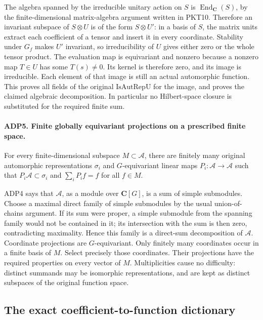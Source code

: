 \documentclass[11pt,a4paper]{article}
\numberwithin{equation}{section}
\theoremstyle{remark}\newtheorem{remark}[theorem]{Remark}
\begin{document}
The algebra spanned by the irreducible unitary action on \(S\) is
\(\operatorname{End}_{\mathbf C}(S)\), by the finite-dimensional
matrix-algebra argument written in PKT10.  Therefore an invariant
subspace of \(S\otimes U\) is of the form \(S\otimes U'\): in a
basis of \(S\), the matrix units extract each coefficient of a tensor
and insert it in every coordinate.  Stability under \(G_f\) makes
\(U'\) invariant, so irreducibility of \(U\) gives either zero or the
whole tensor product.  The evaluation map is equivariant and nonzero
because a nonzero map \(T\in U\) has some \(T(s)\ne0\).  Its kernel
is therefore zero, and its image is irreducible.  Each element of that
image is still an actual automorphic function.  This proves all fields
of the original \(\mathrm{IsAutRepU}\) for the image, and proves the
claimed algebraic decomposition.  In particular no Hilbert-space closure
is substituted for the required finite sum.

\paragraph{ADP5. Finite globally equivariant projections on a prescribed finite space.}
\label{claim:ADP5}
For every finite-dimensional subspace \(M\subset\mathcal A\), there
are finitely many original automorphic representations \(\sigma_i\)
and \(G\)-equivariant linear maps \(P_i:\mathcal A\to\mathcal A\)
such that \(P_i\mathcal A\subset\sigma_i\) and
\(\sum_iP_i f=f\) for all \(f\in M\).

ADP4 says that \(\mathcal A\), as a module over \(\mathbf C[G]\),
is a sum of simple submodules.  Choose a maximal direct family of simple
submodules by the usual union-of-chains argument.  If its sum were
proper, a simple submodule from the spanning family would not be
contained in it; its intersection with the sum is then zero, contradicting
maximality.  Hence this family is a direct-sum decomposition of
\(\mathcal A\).  Coordinate projections are \(G\)-equivariant.
Only finitely many coordinates occur in a finite basis of \(M\).
Select precisely those coordinates.  Their projections have the required
properties on every vector of \(M\).  Multiplicities cause no difficulty:
distinct summands may be isomorphic representations, and are kept as
distinct subspaces of the original function space.

\subsection{The exact coefficient-to-function dictionary}
\end{document}
